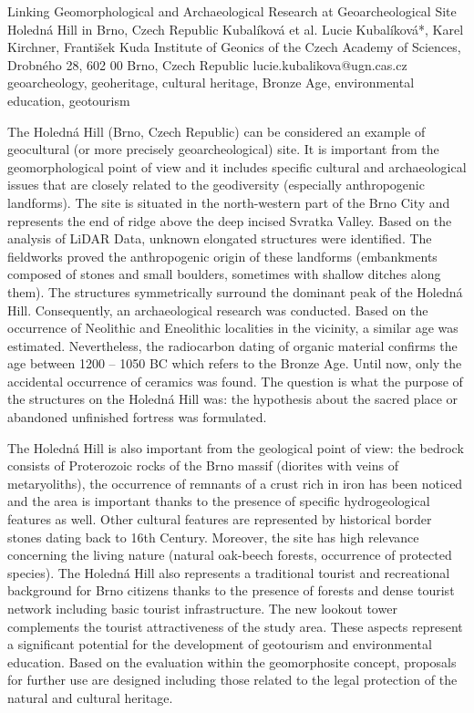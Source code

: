 \abstract
{Linking Geomorphological and Archaeological Research at Geoarcheological Site Holedná Hill in Brno, Czech Republic} 
{Kubalíková et al.} 
{Lucie Kubalíková*, Karel Kirchner, František Kuda} 
{\POtag} 
{Institute of Geonics of the Czech Academy of Sciences, Drobného 28, 602 00 Brno, Czech Republic
}
{lucie.kubalikova@ugn.cas.cz}  %
{geoarcheology, geoheritage, cultural heritage, Bronze Age, environmental education, geotourism}
{The Holedná Hill (Brno, Czech Republic) can be considered an example of geocultural (or more precisely geoarcheological) site. It is important from the geomorphological point of view and it includes specific cultural and archaeological issues that are closely related to the geodiversity (especially anthropogenic landforms). The site is situated in the north-western part of the Brno City and represents the end of ridge above the deep incised Svratka Valley. Based on the analysis of LiDAR Data, unknown elongated structures were identified. The fieldworks proved the anthropogenic origin of these landforms (embankments composed of stones and small boulders, sometimes with shallow ditches along them). The structures symmetrically surround the dominant peak of the Holedná Hill. Consequently, an archaeological research was conducted. Based on the occurrence of Neolithic and Eneolithic localities in the vicinity, a similar age was estimated. Nevertheless, the radiocarbon dating of organic material confirms the age between 1200 -- 1050 BC which refers to the Bronze Age. Until now, only the accidental occurrence of ceramics was found. The question is what the purpose of the structures on the Holedná Hill was: the hypothesis about the sacred place or abandoned unfinished fortress was formulated.

The Holedná Hill is also important from the geological point of view: the bedrock consists of Proterozoic rocks of the Brno massif (diorites with veins of metaryoliths), the occurrence of remnants of a crust rich in iron has been noticed and the area is important thanks to the presence of specific hydrogeological features as well. Other cultural features are represented by historical border stones dating back to 16th Century. Moreover, the site has high relevance concerning the living nature (natural oak-beech forests, occurrence of protected species). The Holedná Hill also represents a traditional tourist and recreational background for Brno citizens thanks to the presence of forests and dense tourist network including basic tourist infrastructure. The new lookout tower complements the tourist attractiveness of the study area. These aspects represent a significant potential for the development of geotourism and environmental education. Based on the evaluation within the geomorphosite concept, proposals for further use are designed including those related to the legal protection of the natural and cultural heritage.
}
